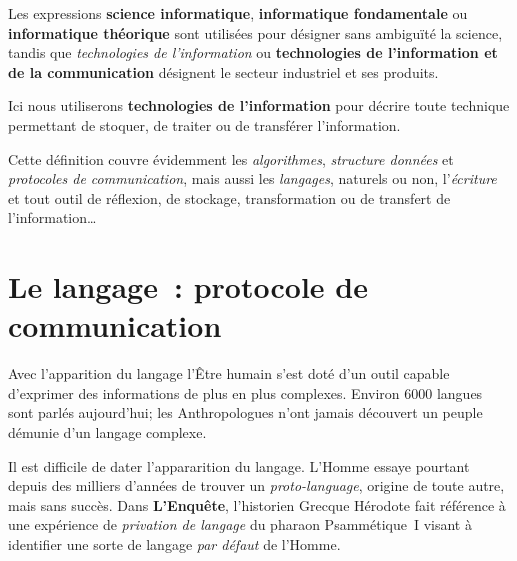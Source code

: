 \begin{coolquote}
Les expressions \textbf{science informatique}, \textbf{informatique fondamentale} ou \textbf{informatique théorique} sont utilisées pour désigner sans ambiguïté la science, tandis que \emph{technologies de l'information} ou \textbf{technologies de l'information et de la communication} désignent le secteur industriel et ses produits.
\end{coolquote}

Ici nous utiliserons \textbf{technologies de l'information} pour décrire toute technique permettant de stoquer, de traiter ou de transférer l'information. 

Cette définition couvre évidemment les \emph{algorithmes}, \emph{structure données} et \emph{protocoles de communication}, mais aussi les \emph{langages}, naturels ou non, l'\emph{écriture} et tout outil de réflexion, de stockage, transformation ou de transfert de l'information\ldots

\chapter{Le langage~: protocole de communication}
Avec l'apparition du langage l'Être humain s'est doté d'un outil capable d'exprimer des informations de plus en plus complexes. Environ 6000 langues sont parlés aujourd'hui; les Anthropologues n'ont jamais découvert un peuple démunie d'un langage complexe\cite{linguistics-pinker}. 

Il est difficile de dater l'appararition du langage. L'Homme essaye pourtant depuis des milliers d'années de trouver un \emph{proto-language}, origine de toute autre, mais sans succès. Dans \textbf{L'Enquête}, l'historien Grecque Hérodote fait référence à une expérience de \emph{privation de langage} du pharaon Psammétique~I visant à identifier une sorte de langage \emph{par défaut} de l'Homme\cite{herodote-privation}. 


